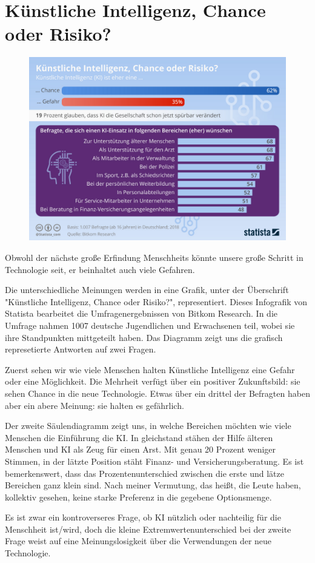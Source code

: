 \documentclass[../Mappe.tex]{subfiles}
\begin{document}
\section{Künstliche Intelligenz, Chance oder Risiko?}

\begin{figure}[b]
    
    \includegraphics[width=\textwidth]{16394}
    \caption{\cite{kichance}}
    \centering
\end{figure}

Obwohl der nächste große Erfindung Menschheits könnte unsere große Schritt in Technologie seit,
er beinhaltet auch viele Gefahren.

Die unterschiedliche Meinungen werden in eine Grafik, unter der Überschrift "Künstliche Intelligenz, Chance oder Risiko?", representiert.
Dieses Infografik von Statista bearbeitet die Umfragenergebnissen von Bitkom Research.
In die Umfrage nahmen 1007 deutsche Jugendlichen und Erwachsenen teil, wobei sie ihre Standpunkten mittgeteilt haben.
Das Diagramm zeigt uns die grafisch represetierte Antworten auf zwei Fragen.

Zuerst sehen wir wie viele Menschen halten Künstliche Intelligenz eine Gefahr oder eine Möglichkeit.
Die Mehrheit verfügt über ein positiver Zukunftsbild: sie sehen Chance in die neue Technologie.
Etwas über ein drittel der Befragten haben aber ein abere Meinung: sie halten es gefährlich.

Der zweite Säulendiagramm zeigt uns, in welche Bereichen möchten wie viele Menschen die Einführung die KI.
In gleichstand stähen der Hilfe älteren Menschen und KI als Zeug für einen Arst.
Mit genau 20 Prozent weniger Stimmen, in der lätzte Position stäht Finanz- und Versicherungsberatung.
Es ist bemerkenswert, dass das Prozentenunterschied zwischen die erste und lätze Bereichen ganz klein sind.
Nach meiner Vermutung, das heißt, die Leute haben, kollektiv gesehen, keine starke Preferenz in die gegebene Optionsmenge.

Es ist zwar ein kontroverseres Frage, ob KI nützlich oder nachteilig für die Menschheit ist/wird,
doch die kleine Extremwertenunterschied bei der zweite Frage weist auf eine Meinungslosigkeit über die Verwendungen der neue Technologie.
\end{document}
